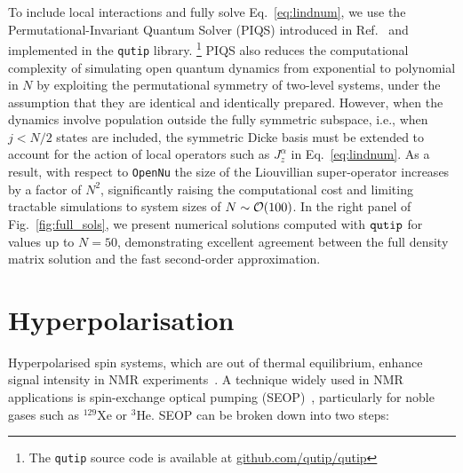 \documentclass[aps,prd,10pt,twocolumn,superscriptaddress,floatfix,nofootinbib,amsmath,amssymb,altaffilletter,preprintnumbers]{revtex4-1}
\begin{document}
To include local interactions and fully solve Eq.~\eqref{eq:lindnum}, we use the Permutational-Invariant Quantum Solver (PIQS) introduced in Ref.~\cite{Shammah_2017} and implemented in the {\tt qutip} library.%
%
\footnote{The  {\tt qutip} source code is available at \href{https://github.com/qutip/qutip}{github.com/qutip/qutip}} 
%
PIQS also reduces the computational complexity of simulating open quantum dynamics from exponential to polynomial in $N$ by exploiting the permutational symmetry of two-level systems, under the assumption that they are identical and identically prepared. However, when the dynamics involve population outside the fully symmetric subspace, i.e., when $j<N/2$ states are included, the symmetric Dicke basis must be extended to account for the action of local operators such as $J^{\alpha}_z$ in Eq.~\eqref{eq:lindnum}. As a result,  with respect to {\tt OpenNu} the size of the Liouvillian super-operator increases by a factor of $N^2$, significantly raising the computational cost and limiting tractable simulations to system sizes of $N\sim {\cal O}(100)$. In the right panel of Fig.~\ref{fig:full_sols}, we present numerical solutions computed with ${\tt qutip}$ for values up to $N=50$, demonstrating excellent agreement between the full density matrix solution and the fast second-order approximation.


\section{Hyperpolarisation}
\label{app:hyperpolarised}

Hyperpolarised spin systems, which are out of thermal equilibrium, enhance signal intensity in NMR experiments~\cite{Eills2023SpinHyperpolarization}. A technique widely used in NMR applications is spin-exchange optical pumping (SEOP)~\cite{RevModPhys.69.629}, particularly for noble gases such as $^{129}$Xe or $^3  $He. SEOP can be broken down into two steps:
\end{document}
